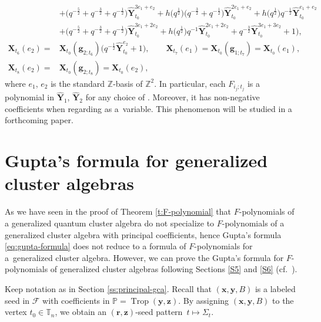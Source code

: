 \documentclass[10pt,a4paper]{amsart}
\numberwithin{equation}{section}
\begin{document}
\begin{Example}[type $G_{2}$]
\begin{align*}
 & +\bigl(q^{-\frac{5}{2}}+q^{-\frac{3}{2}}+q^{-\frac{1}{2}}\bigr)\mathbf{\hat{Y}}_{t_0}^{3e_1+e_2}+h\bigl(q^{\frac{1}{2}}\bigr)\bigl(q^{-\frac{3}{2}}+q^{-\frac{1}{2}}\bigr)
 \mathbf{\hat{Y}}_{t_0}^{2e_1+e_2}+h\bigl(q^{\frac{1}{2}}\bigr)q^{-\frac{1}{2}}\mathbf{\hat{Y}}_{t_0}^{e_1+e_2}\\
 & +\bigl(q^{-\frac{5}{2}}+q^{-\frac{3}{2}}+q^{-\frac{1}{2}}\bigr)\mathbf{\hat{Y}}_{t_0}^{3e_1+2e_2}+h\bigl(q^{\frac{1}{2}}\bigr)q^{-1}\mathbf{\hat{Y}}_{t_0}^{2e_1+2e_2}
 +q^{-\frac{3}{2}}\mathbf{\hat{Y}}_{t_0}^{3e_1+3e_2}+1
 \bigr),\\
 \mathbf{X}_{t_6}(e_2)={}&\mathbf{X}_{t_0}(\mathbf{g}_{2;t_6})\bigl(q^{-\frac{1}{2}}\mathbf{\hat{Y}}_{t_0}^{e_2}+1\bigr),\qquad
 \mathbf{X}_{t_7}(e_1)= \mathbf{X}_{t_0}(\mathbf{g}_{1;t_7})=\mathbf{X}_{t_0}(e_1),\\
 \mathbf{X}_{t_8}(e_2)={}&\mathbf{X}_{t_0}(\mathbf{g}_{2;t_8})=\mathbf{X}_{t_0}(e_{2}),
\end{align*}
where $e_1$, $e_2$ is the standard $\mathbb{Z}$-basis of $\mathbb{Z}^2$.
In particular, each $F_{i_j;t_j}$ is a polynomial in $\mathbf{\hat{Y}}_{1}$, $\mathbf{\hat{Y}}_2$ for any choice of . Moreover, it has non-negative coefficients when regarding  as a~variable. This phenomenon will be studied in a forthcoming paper.
\end{Example}



\section{Gupta's formula for generalized cluster algebras} \label{s:gupta-formula-gca}
As we have seen in the proof of Theorem \ref{t:F-polynomial} that $F$-polynomials of a generalized quantum cluster algebra do not specialize to $F$-polynomials of a generalized cluster algebra with principal coefficients, hence Gupta's formula \eqref{eq:gupta-formula} does not reduce to a formula of $F$-polynomials for a~generalized cluster algebra.
However, we can prove the Gupta's formula for $F$-polynomials of generalized cluster algebras following Sections \ref{S5} and \ref{S6} (cf.\ \cite{LMN2023}).

Keep notation as in Section \ref{ss:principal-gca}. Recall that $(\mathbf{x},\mathbf{y},B)$ is a labeled seed in $\mathcal{F}$ with coefficients in $\mathbb{P}=\operatorname{Trop}(\mathbf{y},\mathbf{z})$.
By assigning $(\mathbf{x},\mathbf{y},B)$ to the vertex $t_0\in \mathbb{T}_n$, we obtain an $(\mathbf{r},\mathbf{z})$-seed pattern~${t\mapsto \Sigma_t}$.
\end{document}
